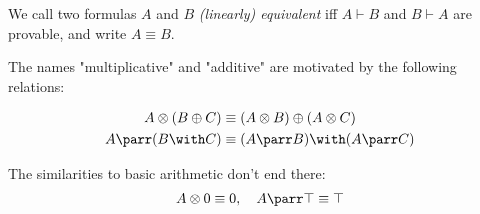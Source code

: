 \documentclass[DIN, pagenumber=false, fontsize=11pt, parskip=half, colorinlistoftodos, svgnames]{scrartcl}
\begin{document}
	
	
	\begin{definition}
		We call two formulas $A$ and $B $ \emph{(linearly) equivalent} iff $A \vdash B$ and $B \vdash A $ are provable, and write $A \equiv B$.
	\end{definition}
	
	\begin{remark}
		The names "multiplicative" and "additive" are motivated by the following relations:
		
		\begin{align*}
			A \otimes (B \oplus C) 
			& \equiv (A \otimes B) \oplus (A \otimes C)
			\\
			A \parr (B \with C ) 
			& \equiv (A \parr B) \with (A \parr C )
		\end{align*}
		
		The similarities to basic arithmetic don't end there:
		\begin{align*}
			A \otimes 0 \equiv 0 ,
			\quad 
			A \parr \top \equiv \top
		\end{align*}
	\end{remark}
	
\end{document}
